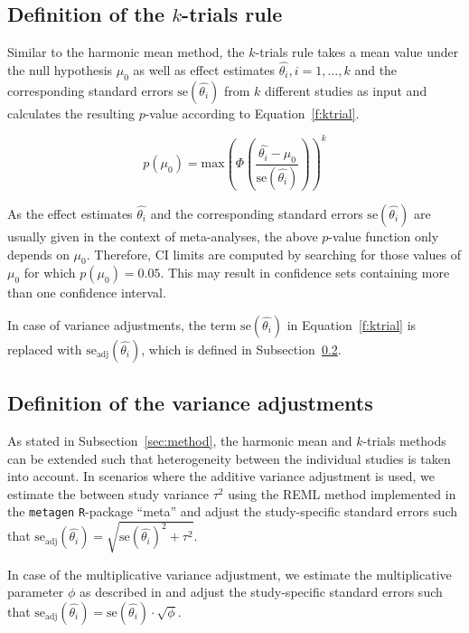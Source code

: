 \documentclass[letterpaper, 9pt]{article}
\begin{document}
\subsection{Definition of the $k$-trials rule} \label{sec:ktrial}

Similar to the harmonic mean method, the $k$-trials rule takes a mean value under the null hypothesis $\mu_{0}$ as well as effect estimates $\hat{\theta_{i}}, i = 1, \dots, k$ and the corresponding standard errors $\text{se}(\hat{\theta_i})$ from $k$ different studies as input and calculates the resulting $p$-value according to Equation~\ref{f:ktrial}.

\begin{equation}\label{f:ktrial}
p(\mu_0) = \text{max} \left( \Phi \left( \frac{\hat{\theta_i} - \mu_0}{\text{se}(\hat{\theta_{i}})} \right) \right)^k
\end{equation}

As the effect estimates $\hat{\theta_i}$ and the corresponding standard errors $\text{se}(\hat{\theta_i})$ are usually given in the context of meta-analyses, the above $p$-value function only depends on $\mu_{0}$. Therefore, CI limits are computed by searching for those values of $\mu_0$ for which $p(\mu_0) = 0.05$. This may result in confidence sets containing more than one confidence interval. 

In case of variance adjustments, the term $\text{se}(\hat{\theta_i})$  in Equation~\ref{f:ktrial} is replaced with $\text{se}_{\text{adj}}(\hat{\theta_i})$, which is defined in Subsection~\ref{sec:varadj}.

\subsection{Definition of the variance adjustments} \label{sec:varadj}

As stated in Subsection~\ref{sec:method}, the harmonic mean and $k$-trials methods can be extended such that heterogeneity between the individual studies is taken into account. In scenarios where the additive variance adjustment is used, we estimate the between study variance $\tau^2$ using the REML method implemented in the \texttt{metagen} \texttt{R}-package ``meta'' and adjust the study-specific standard errors such that $\text{se}_{\text{adj}}(\hat{\theta_i}) = \sqrt{\text{se}(\hat{\theta_i})^2 + \tau^2}$.

In case of the multiplicative variance adjustment, we estimate the multiplicative parameter $\phi$ as described in \citet{mawd:etal:17} and adjust the study-specific standard errors such that $\text{se}_{\text{adj}}(\hat{\theta_i}) = \text{se}(\hat{\theta_i}) \cdot \sqrt{\phi}$.
\end{document}
